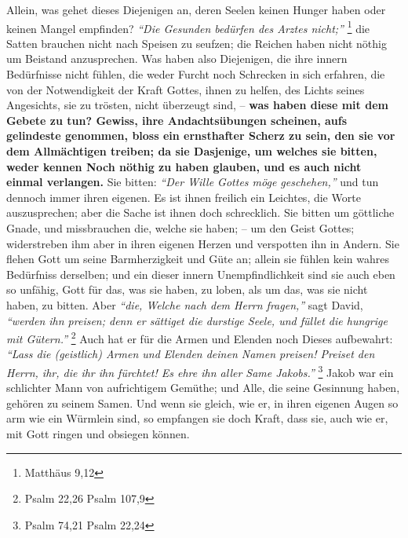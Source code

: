   Allein, was gehet dieses
Diejenigen an, deren Seelen keinen Hunger haben oder keinen Mangel empfinden?
\textit{"`Die Gesunden bedürfen des Arztes nicht;"'}
\footnote{Matthäus 9,12}
die Satten brauchen nicht nach Speisen zu
seufzen; die Reichen haben nicht nöthig um Beistand anzusprechen. Was haben also
Diejenigen, die ihre innern Bedürfnisse  nicht
fühlen, die weder Furcht noch
Schrecken in sich erfahren, die von der Notwendigkeit der Kraft Gottes, ihnen
zu helfen, des Lichts seines Angesichts, sie zu trösten, nicht
überzeugt sind,
-- \textbf{was haben diese mit dem Gebete zu tun? Gewiss, ihre Andachtsübungen
scheinen, aufs gelindeste genommen, bloss ein ernsthafter Scherz zu sein, den
sie vor dem Allmächtigen treiben; da sie Dasjenige, um welches sie bitten, weder
kennen Noch nöthig zu haben glauben, und es auch nicht einmal verlangen.} Sie
bitten:
\textit{"`Der Wille Gottes möge geschehen,"'}
und tun dennoch immer ihren
eigenen. Es ist ihnen freilich ein
Leichtes, die Worte auszusprechen; aber die
Sache ist ihnen doch schrecklich. Sie bitten um göttliche Gnade, und
missbrauchen die, welche sie haben; -- um den Geist Gottes; widerstreben ihm
aber in ihren eigenen Herzen und verspotten ihn in Andern.
Sie flehen Gott um
seine Barmherzigkeit und Güte an; allein sie fühlen kein wahres Bedürfniss
derselben; und ein dieser innern Unempfindlichkeit sind sie auch eben so
unfähig, Gott für das, was sie haben, zu loben, als um das, was sie nicht haben,
zu bitten. Aber  \textit{"`die, Welche nach dem Herrn fragen,"'} sagt David,
\textit{"`werden ihn preisen; denn er sättiget die durstige Seele, und füllet
die hungrige mit Gütern."'}
\footnote{Psalm 22,26 Psalm 107,9}
Auch hat er für die Armen und Elenden
noch Dieses aufbewahrt:
\textit{"`Lass die (geistlich) Armen und Elenden deinen Namen
preisen! Preiset den Herrn, ihr, die ihr ihn fürchtet! Es ehre ihn aller Same
Jakobs."'}
\footnote{Psalm 74,21 Psalm 22,24}
Jakob war ein schlichter Mann von
aufrichtigem Gemüthe; und Alle, die seine Gesinnung haben, gehören zu seinem
Samen. Und wenn sie gleich, wie er, in ihren eigenen Augen so arm wie ein
Würmlein sind, so empfangen sie doch Kraft, dass sie, auch wie er, mit Gott
ringen und obsiegen können.

